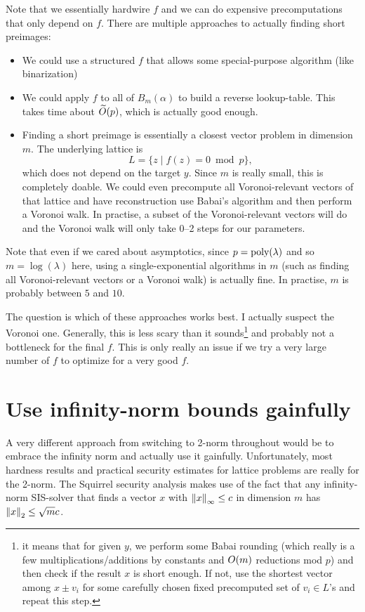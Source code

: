 \documentclass{article}
\begin{document}
Note that we essentially hardwire $f$ and we can do expensive precomputations that only depend on $f$. There are multiple approaches to actually finding short preimages:
\begin{itemize}
 \item We could use a structured $f$ that allows some special-purpose algorithm (like binarization)
 \item We could apply $f$ to all of $B_m(\alpha)$ to build a reverse lookup-table. This takes time about $\widetilde{O}(p)$, which is actually good enough.
 \item Finding a short preimage is essentially a closest vector problem in dimension $m$. The underlying lattice is \[L=\{z \mid f(z) = 0 \bmod p\},\] which does not depend on the target $y$. Since $m$ is really small, this is completely doable. We could even precompute all Voronoi-relevant vectors of that lattice and have reconstruction use Babai's algorithm and then perform a Voronoi walk. In practise, a subset of the Voronoi-relevant vectors will do and the Voronoi walk will only take 0--2 steps for our parameters.
\end{itemize}
Note that even if we cared about asymptotics, since $p=\textnormal{poly}(\lambda)$ and so $m=\log(\lambda)$ here, using a single-exponential algorithms in $m$ (such as finding all Voronoi-relevant vectors or a Voronoi walk) is actually fine. In practise, $m$ is probably between $5$ and $10$.

The question is which of these approaches works best. I actually suspect the Voronoi one. Generally, this is less scary than it sounds\footnote{it means that for given $y$, we perform some Babai rounding (which really is a few multiplications/additions by constants and $O(m)$ reductions mod $p$) and then check if the result $x$ is short enough. If not, use the shortest vector among $x\pm v_i$ for some carefully chosen fixed precomputed set of $v_i\in L$'s and repeat this step.} and probably not a bottleneck for the final $f$. This is only really an issue if we try a very large number of $f$ to optimize for a very good $f$.

\section{Use infinity-norm bounds gainfully}

A very different approach from switching to 2-norm throughout would be to embrace the infinity norm and actually use it gainfully. Unfortunately, most hardness results and practical security estimates for lattice problems are really for the 2-norm.
The Squirrel security analysis makes use of the fact that any infinity-norm SIS-solver that finds a vector $x$ with ${\lVert{x}\rVert}_{\infty} \leq c$ in dimension $m$ has ${\lVert{x}\rVert}_2 \leq \sqrt{m} c$.
\end{document}
